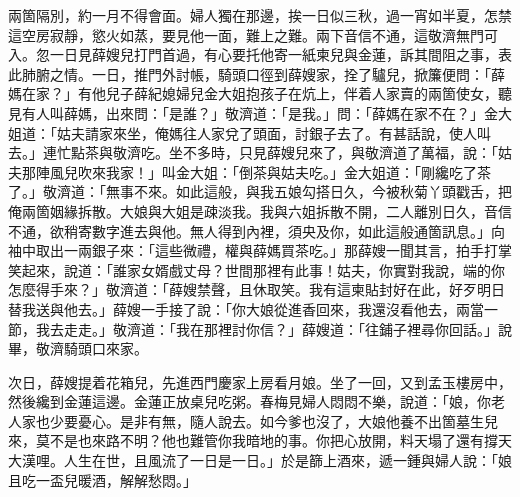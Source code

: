 兩箇隔別，約一月不得會面。婦人獨在那邊，挨一日似三秋，過一宵如半夏，怎禁這空房寂靜，慾火如蒸，要見他一面，難上之難。兩下音信不通，這敬濟無門可入。忽一日見薛嫂兒打門首過，有心要托他寄一紙柬兒與金蓮，訴其間阻之事，表此肺腑之情。一日，推門外討帳，騎頭口徑到薛嫂家，拴了驢兒，掀簾便問：「薛媽在家？」有他兒子薛紀媳婦兒金大姐抱孩子在炕上，伴着人家賣的兩箇使女，聽見有人叫薛媽，出來問：「是誰？」敬濟道：「是我。」問：「薛媽在家不在？」金大姐道：「姑夫請家來坐，俺媽往人家兌了頭面，討銀子去了。有甚話說，使人叫去。」連忙點茶與敬濟吃。坐不多時，只見薛嫂兒來了，與敬濟道了萬福，說：「姑夫那陣風兒吹來我家！」叫金大姐：「倒茶與姑夫吃。」金大姐道：「剛纔吃了茶了。」敬濟道：「無事不來。如此這般，與我五娘勾搭日久，今被秋菊丫頭戳舌，把俺兩箇姻緣拆散。大娘與大姐是疎淡我。我與六姐拆散不開，二人離別日久，音信不通，欲稍寄數字進去與他。無人得到內裡，須央及你，如此這般通箇訊息。」向袖中取出一兩銀子來：「這些微禮，權與薛媽買茶吃。」那薛嫂一聞其言，拍手打掌笑起來，說道：「誰家女婿戲丈母？世間那裡有此事！姑夫，你實對我說，端的你怎麼得手來？」敬濟道：「薛嫂禁聲，且休取笑。我有這柬貼封好在此，好歹明日替我送與他去。」薛嫂一手接了說：「你大娘從進香回來，我還沒看他去，兩當一節，我去走走。」敬濟道：「我在那裡討你信？」薛嫂道：「往鋪子裡尋你回話。」說畢，敬濟騎頭口來家。

次日，薛嫂提着花箱兒，先進西門慶家上房看月娘。坐了一回，又到孟玉樓房中，然後纔到金蓮這邊。金蓮正放桌兒吃粥。春梅見婦人悶悶不樂，說道：「娘，你老人家也少要憂心。是非有無，隨人說去。如今爹也沒了，大娘他養不出箇墓生兒來，莫不是也來路不明？他也難管你我暗地的事。你把心放開，料天塌了還有撐天大漢哩。人生在世，且風流了一日是一日。」{}於是篩上酒來，遞一鍾與婦人說：「娘且吃一盃兒暖酒，解解愁悶。」

